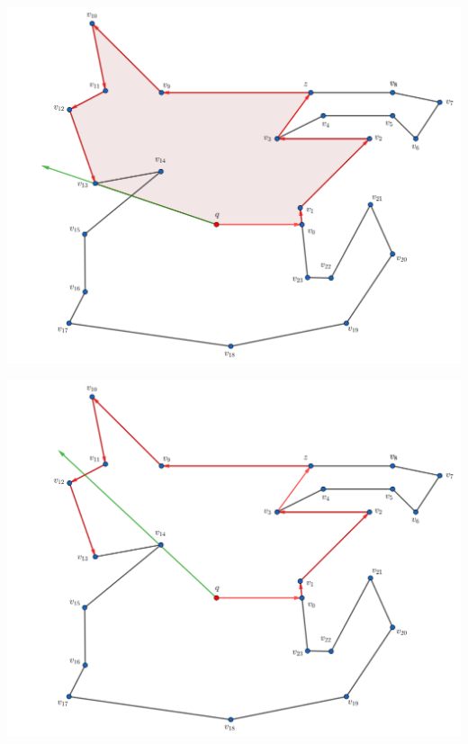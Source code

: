 \begin{frame}
  \centering \includegraphics[width=0.70 \paperwidth]{images/Ejecucion/e12.png}
\end{frame}

\begin{frame}
  \centering \includegraphics[width=0.70 \paperwidth]{images/Ejecucion/e13.png}
\end{frame}

